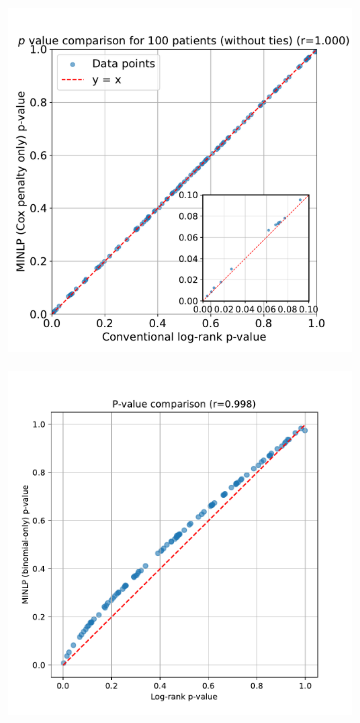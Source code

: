 \documentclass[article]{jss}
\begin{document}
\begin{figure}
\begin{subfigure}[t]{0.32\textwidth}
  \caption{\label{fig:compare-p-value-10-patients-no-ties}}
\end{subfigure}
\begin{subfigure}[t]{0.32\textwidth}
  \centering
  \includegraphics[width=\linewidth]{p_value_comparison_100_patients_no_ties.pdf}
  \caption{\label{fig:compare-p-value-100-patients-no-ties}}
\end{subfigure}
\begin{subfigure}[t]{0.32\textwidth}
  \centering
  \includegraphics[width=\linewidth]{p_value_comparison_1000_patients_no_ties.pdf}

\end{subfigure}
\end{figure}
\end{document}
